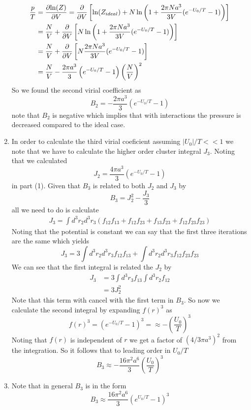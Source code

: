 \documentclass[11pt]{article}
\numberwithin{equation}{section}
\begin{document}
\begin{enumerate}[(1)]
\begin{align*}
\frac{p}{T} &= \frac{\partial{\ln(Z)}}{\partial{V}} = \frac{\partial{}}{\partial{V}}\left[\ln(Z_{ideal})+N\ln\left(1+\frac{2\pi{N}a^3}{3V}(e^{-U_0/T}-1)\right)\right]\\
&= \frac{N}{V} + \frac{\partial{}}{\partial{V}}\left[N\ln\left(1+\frac{2\pi{N}a^3}{3V}(e^{-U_0/T}-1)\right)\right]\\
&= \frac{N}{V} + \frac{\partial{}}{\partial{V}}\left[N\frac{2\pi{N}a^3}{3V}(e^{-U_0/T}-1)\right]\\
&= \frac{N}{V} - \frac{2\pi{a^3}}{3}\left(e^{-U_0/T}-1\right)\left(\frac{N}{V}\right)^2
\end{align*}
So we found the second virial coefficient as
$$B_2 = -\frac{2\pi{a^3}}{3}\left(e^{-U_0/T}-1\right)$$
note that $B_2$ is negative which implies that with interactions the pressure is decreased 
compared to the ideal case.

\item In order to calculate the third virial coeficient assuming $|U_0|/T<<1$ we note that
we have to calculate the higher order cluster integral $J_3$. Noting that we calculated
$$J_2 = \frac{4\pi{a^3}}{3}\left(e^{-U_0/T}-1\right)$$
in part (1). Given that $B_3$ is related to both $J_2$ and $J_3$ by
$$B_3 = J_2^2-\frac{J_3}{3}$$
all we need to do is calculate 
\begin{align*}
J_3 = \int d^3r_{2}d^3r_{3}\left(f_{12}f_{13} + f_{12}f_{23}+f_{13}f_{23}+f_{12}f_{23}f_{23}\right)
\end{align*}
Noting that the potential is constant we can say that the first three iterations are the same 
which yields
$$J_3 = 3\int d^3r_{2}d^3r_{3}f_{12}f_{13} + \int{d^3r_{2}d^3r_{3}}f_{12}f_{23}f_{23}$$
We can see that the first integral is related the $J_2$ by
\begin{align*}
J_3 &= 3\int d^3r_{3}f_{13}\int d^3r_{2}f_{12}\\
&= 3J_2^2
\end{align*}
Note that this term with cancel with the first term in $B_3$. So now we calculate the second
integral by expanding $f(r)^3$ as
$$f(r)^3 = \left(e^{-U_0/T}-1\right)^3 = \approx -\left(\frac{U_0}{T}\right)^3$$
Noting that $f(r)$ is independent of $r$ we get a factor of $(4/3\pi{a}^3)^2$ from the 
integration. So it follows that to leading order in $U_0/T$
$$B_3 \approx -\frac{16\pi^2a^6}{3}\left(\frac{U_0}{T}\right)^3$$

\item Note that in general $B_3$ is in the form
$$B_3 \approx \frac{16\pi^2a^6}{3}\left(e^{U_0/T}-1\right)^3$$
\end{enumerate}
\end{document}
